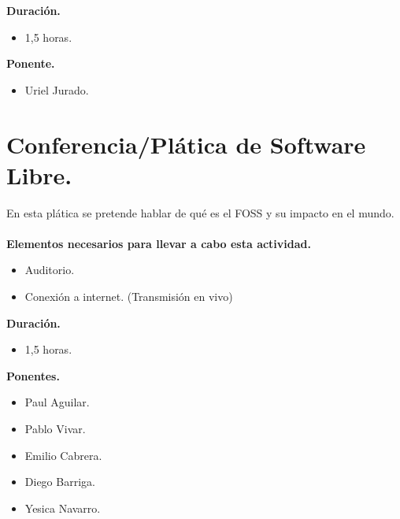 \documentclass[a4paper,11pt]{article}                 %
\begin{document}
  \textbf{Duración.}
  \begin{itemize}
    \item 1,5 horas.
  \end{itemize}
  
          \textbf{Ponente.}
  \begin{itemize}
    \item Uriel Jurado.
  \end{itemize}
  
      \section{Conferencia/Plática de Software Libre.}                                     %

   En esta plática se pretende hablar de qué es el FOSS y su impacto en el mundo. 
      \paragraph{}
  \textbf{Elementos necesarios para llevar a cabo esta actividad.}
  \begin{itemize}
    \label{list:sl}
    \item Auditorio.
        \item Conexión a internet. (Transmisión en vivo)
  \end{itemize}
  
  \textbf{Duración.}
  \begin{itemize}
    \item 1,5 horas.
  \end{itemize}
  
            \textbf{Ponentes.}
  \begin{itemize}
    \item Paul Aguilar.
    \item Pablo Vivar.
    \item Emilio Cabrera.
    \item Diego Barriga.
    \item Yesica Navarro.
  \end{itemize}
  
\end{document}
